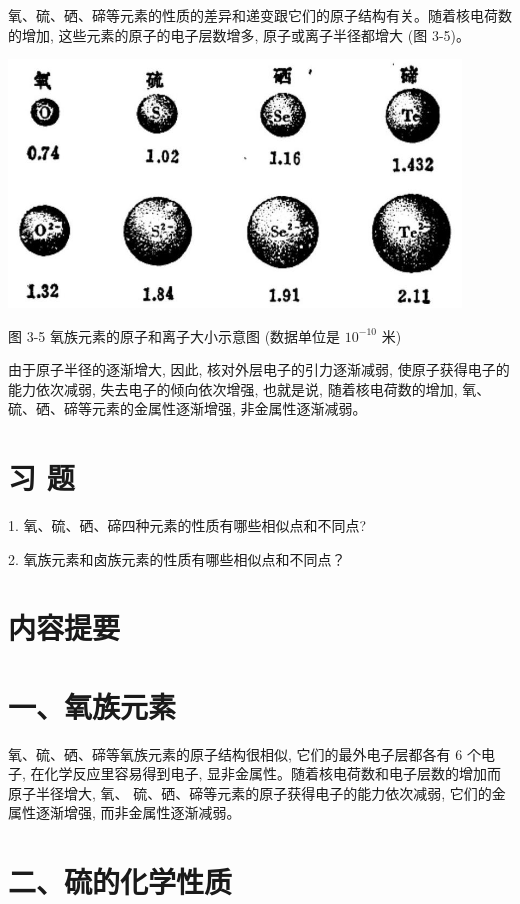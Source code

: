 \documentclass[10pt]{article}
\begin{document}
氧、硫、硒、碲等元素的性质的差异和递变跟它们的原子结构有关。随着核电荷数的增加, 这些元素的原子的电子层数增多, 原子或离子半径都增大 (图 3-5)。

\begin{center}
\includegraphics[max width=0.9\textwidth]{images/01912d0f-097c-7e75-8f32-4f326cd86c9f_83_843063.jpg}
\end{center}

图 3-5 氧族元素的原子和离子大小示意图 (数据单位是 \({10}^{-{10}}\) 米)

由于原子半径的逐渐增大, 因此, 核对外层电子的引力逐渐减弱, 使原子获得电子的能力依次减弱, 失去电子的倾向依次增强, 也就是说, 随着核电荷数的增加, 氧、硫、硒、碲等元素的金属性逐渐增强, 非金属性逐渐减弱。

\section*{习 题}

1. 氧、硫、硒、碲四种元素的性质有哪些相似点和不同点?

2. 氧族元素和卤族元素的性质有哪些相似点和不同点？

\section*{内容提要}

\section*{一、氧族元素}

氧、硫、硒、碲等氧族元素的原子结构很相似, 它们的最外电子层都各有 6 个电子, 在化学反应里容易得到电子, 显非金属性。随着核电荷数和电子层数的增加而原子半径增大, 氧、 硫、硒、碲等元素的原子获得电子的能力依次减弱, 它们的金属性逐渐增强, 而非金属性逐渐减弱。

\section*{二、硫的化学性质}
\end{document}
